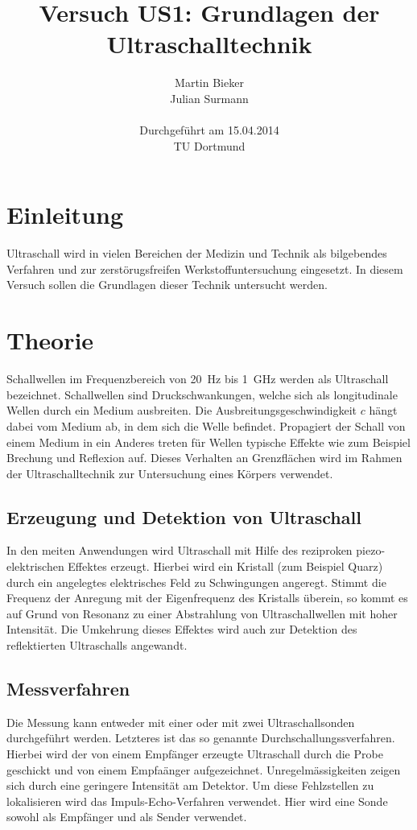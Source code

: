 \documentclass[11pt,ngerman,a4paper]{article}
\title{\textbf{Versuch US1: Grundlagen der Ultraschalltechnik}}
\author{Martin Bieker\\
		Julian Surmann\\
		\\
		Durchgef\"{u}hrt am 15.04.2014\\
		TU Dortmund}
\date{}
\begin{document}
\renewcommand\tablename{Tabelle}
\renewcommand\figurename{Abbildung}
\maketitle
\thispagestyle{empty}
\newpage
\clearpage
\setcounter{page}{1}


\section{Einleitung}
Ultraschall wird in vielen Bereichen der Medizin und Technik als bilgebendes Verfahren und zur zerst\"orugsfreifen Werkstoffuntersuchung eingesetzt. In diesem Versuch sollen die Grundlagen dieser Technik untersucht werden.
\section{Theorie}

Schallwellen im Frequenzbereich von \SI{20}{\hertz} bis \SI{1}{\giga\hertz} werden als Ultraschall bezeichnet. Schallwellen sind Druckschwankungen, welche sich als longitudinale Wellen durch ein Medium ausbreiten. Die Ausbreitungsgeschwindigkeit $c$ h\"angt dabei vom Medium ab, in dem sich die Welle befindet. Propagiert der Schall von einem Medium in ein Anderes treten f\"ur Wellen typische Effekte wie zum Beispiel Brechung und Reflexion auf. Dieses Verhalten an Grenzfl\"achen wird im Rahmen der Ultraschalltechnik zur Untersuchung eines K\"orpers verwendet. 
\subsection{Erzeugung und Detektion von Ultraschall}
In den meiten Anwendungen wird Ultraschall mit Hilfe des reziproken piezo-elektrischen Effektes erzeugt. Hierbei wird ein Kristall (zum Beispiel Quarz) durch ein angelegtes elektrisches Feld zu Schwingungen angeregt. Stimmt die Frequenz der Anregung mit der Eigenfrequenz des Kristalls \"uberein, so kommt es auf Grund von Resonanz zu einer Abstrahlung von Ultraschallwellen mit hoher Intensit\"at.  Die Umkehrung dieses Effektes wird auch zur Detektion des reflektierten Ultraschalls angewandt.
\subsection{Messverfahren} 
Die Messung kann entweder mit einer oder mit zwei Ultraschallsonden durchgef\"uhrt werden. Letzteres ist das so genannte Durchschallungssverfahren. Hierbei wird der von einem Empf\"anger erzeugte Ultraschall durch die Probe geschickt und von einem Empfa\"anger aufgezeichnet. Unregelm\"assigkeiten zeigen sich durch eine geringere Intensit\"at am Detektor. Um diese Fehlzstellen zu lokalisieren wird das Impuls-Echo-Verfahren verwendet. Hier wird eine Sonde sowohl als Empf\"anger und als Sender verwendet.
\end{document}

